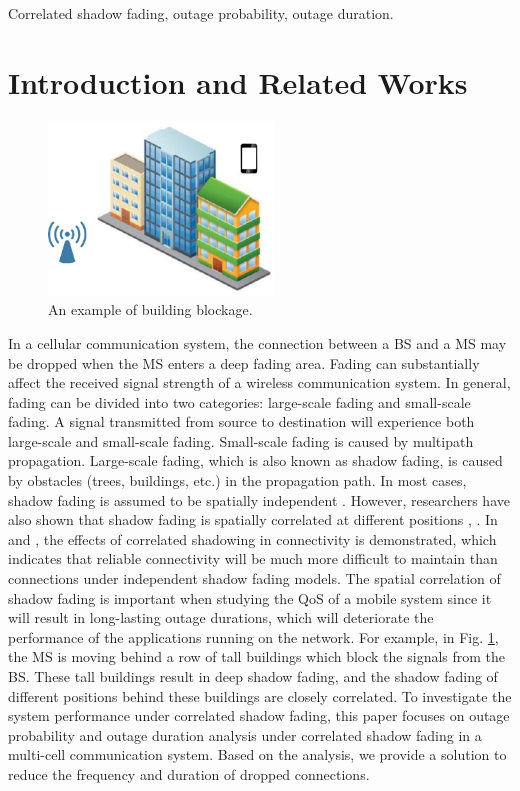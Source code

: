 \documentclass[journal,10pt]{IEEEtran}
\begin{document}
\begin{IEEEkeywords}
Correlated shadow fading, outage probability, outage duration.
\end{IEEEkeywords}

\section{Introduction and Related Works}
\begin{figure}
\centering
\includegraphics[width=6cm]{building.eps}
\caption{An example of building blockage.}
\label{building}
\end{figure}
\par In a cellular communication system, the connection between a BS and a MS may be dropped when the MS enters a deep fading area. Fading can substantially affect the received signal strength of a wireless communication system. In general, fading can be divided into two categories: large-scale fading and small-scale fading. A signal transmitted from source to destination will experience both large-scale and small-scale fading. Small-scale fading is caused by multipath propagation. Large-scale fading, which is also known as shadow fading, is caused by obstacles (trees, buildings, etc.) in the propagation path. In most cases, shadow fading is assumed to be spatially independent \cite{rappaport1996wireless}.  However, researchers have also shown that shadow fading is spatially correlated at different positions \cite{gudmundson1991correlation}, \cite{zhang2008novel}. In \cite{fabbri2009impact} and \cite{patwari2008effects}, the effects of correlated shadowing in connectivity is demonstrated, which indicates that reliable connectivity will be much more difficult to maintain than connections under independent shadow fading models. The spatial correlation of shadow fading is important when studying the QoS of a mobile system since it will result in long-lasting outage durations, which will deteriorate the performance of the applications running on the network. For example, in Fig. \ref{building}, the MS is moving behind a row of tall buildings which block the signals from the BS. These tall buildings result in deep shadow fading, and the shadow fading of different positions behind these buildings are closely correlated. To investigate the system performance under correlated shadow fading, this paper focuses on outage probability and outage duration analysis under correlated shadow fading in a multi-cell communication system. Based on the analysis, we provide a solution to reduce the frequency and duration of dropped connections.
\end{document}

